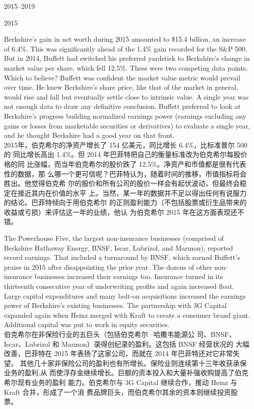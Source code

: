 \begin{chapter}{2015--2019}
\begin{section}{2015}
\begin{verseparallel}
  {
    Berkshire's gain in net worth during 2015 amounted to \$15.4 billion, an
    increase of 6.4\%. This was significantly ahead of the 1.4\% gain recorded
    for the S\&P 500. But in 2014, Buffett had switched his preferred yardstick
    to Berkshire's change in market value per share, which fell 12.5\%. These
    were two competing data points. Which to believe? Buffett was confident the
    market value metric would prevail over time. He knew Berkshire's share
    price, like that of the market in general, would rise and fall but
    eventually settle close to intrinsic value. A single year was not enough
    data to draw any definitive conclusion. Buffett preferred to look at
    Berkshire's progress building normalized earnings power (earnings excluding
    any gains or losses from marketable securities or derivatives) to evaluate a
    single year, and he thought Berkshire had a good year on that front. \\
  }
  {
    2015年，伯克希尔的净资产增长了 154 亿美元，同比增长 6.4\%，比标准普尔 500 的
    同比增长高出 1.4\%。但 2014 年巴菲特把自己的衡量标准改为伯克希尔每股价格的同
    比涨幅，而当年伯克希尔的股价跌了 12.5\%。净资产和市值都是很有代表性的数据，那
    么哪一个更可信呢？巴菲特认为，随着时间的推移，市值指标将会胜出。他觉得伯克希
    尔的股价和所有公司的股价一样会有起伏波动，但最终会稳定在接近其内在价值的水平
    上。当然，某一年的数据并不足以得出任何有说服力的结论。巴菲特倾向于用伯克希尔
    的正则盈利能力（不包括股票或衍生品带来的收益或亏损）来评估这一年的业绩，他认
    为伯克希尔 2015 年在这方面表现还不错。
  }
\end{verseparallel}

\begin{verseparallel}
  {
    The Powerhouse Five, the largest non-insurance businesses (comprised of
    Berkshire Hathaway Energy, BNSF, Iscar, Lubrizol, and Marmon), reported
    record earnings. That included a turnaround by BNSF, which earned Buffett's
    praise in 2015 after disappointing the prior year. The dozens of other
    non-insurance businesses increased their earnings too. Insurance turned in
    its thirteenth consecutive year of underwriting profits and again increased
    float. Large capital expenditures and many bolt-on acquisitions increased
    the earnings power of Berkshire's existing businesses. The partnership with
    3G Capital expanded again when Heinz merged with Kraft to create a consumer
    brand giant. Additional capital was put to work in equity securities. \\
  }
  {
    伯克希尔在非保险行业的五巨头（包括伯克希尔·哈撒韦能源公
    司、BNSF、Iscar、Lubrizol 和 Marmon）录得创纪录的盈利。这包括 BNSF 经营状况的
    大幅改善，巴菲特在 2015 年表扬了这家公司，而就在 2014 年巴菲特还对它非常失望。
    其他几十家非保险公司的盈利也有所增长。保险业则连续第十三年收获承保业务的盈利,从
    而使浮存金继续增长。巨额的资本投入和大量补强收购提高了伯克希尔现有业务的盈利
    能力。伯克希尔与 3G Capital 继续合作，推动 Heinz 与 Kraft 合并，形成了一个消
    费品牌巨头，而伯克希尔其余的资本则继续投资股票。
  }
\end{verseparallel}


\end{section}
\end{chapter}
